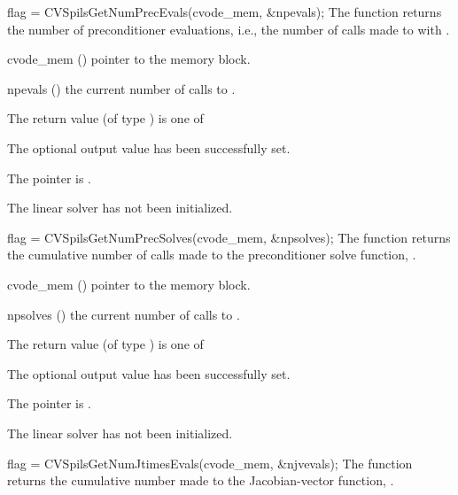 {}
{
  flag = CVSpilsGetNumPrecEvals(cvode\_mem, \&npevals);
}
{
  The function  returns the
  number of preconditioner evaluations, i.e., the number of 
  calls made to  with .
}
{
  \begin{args}
  \item[cvode\_mem] ()
    pointer to the {\cvode} memory block.
  \item[npevals] ()
    the current number of calls to .
  \end{args}
}
{
  The return value  (of type ) is one of
  \begin{args}
  \item[\Id{CVSPILS\_SUCCESS}] 
    The optional output value has been successfully set.
  \item[\Id{CVSPILS\_MEM\_NULL}]
    The  pointer is .
  \item[\Id{CVSPILS\_LMEM\_NULL}]
    The {\cvspils} linear solver has not been initialized.
  \end{args}
}
{}
{
  flag = CVSpilsGetNumPrecSolves(cvode\_mem, \&npsolves);
}
{
  The function  returns the
  cumulative number of calls made to the preconditioner 
  solve function, .
}
{
  \begin{args}
  \item[cvode\_mem] ()
    pointer to the {\cvode} memory block.
  \item[npsolves] ()
    the current number of calls to .
  \end{args}
}
{
  The return value  (of type ) is one of
  \begin{args}
  \item[\Id{CVSPILS\_SUCCESS}] 
    The optional output value has been successfully set.
  \item[\Id{CVSPILS\_MEM\_NULL}]
    The  pointer is .
  \item[\Id{CVSPILS\_LMEM\_NULL}]
    The {\cvspils} linear solver has not been initialized.
  \end{args}
}
{}
{
  flag = CVSpilsGetNumJtimesEvals(cvode\_mem, \&njvevals);
}
{
  The function  returns the
  cumulative number made to the Jacobian-vector function,
  .
}
